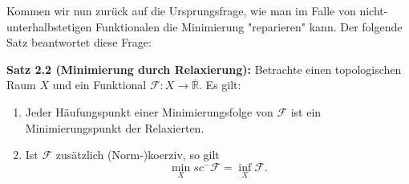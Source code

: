Kommen wir nun zurück auf die Ursprungsfrage, wie man im Falle von nicht-\\unterhalbstetigen Funktionalen die Minimierung "reparieren" kann. Der folgende Satz beantwortet diese Frage:\\
\colorbox{theored}{\begin{minipage}{16cm}{\textcolor{black}{}{\label{theo2.2}}}
\textbf{Satz 2.2 (Minimierung durch Relaxierung):} Betrachte einen topologischen Raum \(X\) und ein Funktional \(\mathcal{F}: X \to \overline{\mathbb{R}}\). Es gilt:
\begin{enumerate}
    \item Jeder Häufungspunkt einer Minimierungsfolge von \(\mathcal{F}\) ist ein Minimierungspunkt der Relaxierten.
    \item Ist \(\mathcal{F}\) zusätzlich (Norm-)koerziv, so gilt
        \begin{equation}
            \min_X sc^- \mathcal{F} = \inf_X \mathcal{F}.
        \end{equation}
\end{enumerate}
\end{minipage}}


